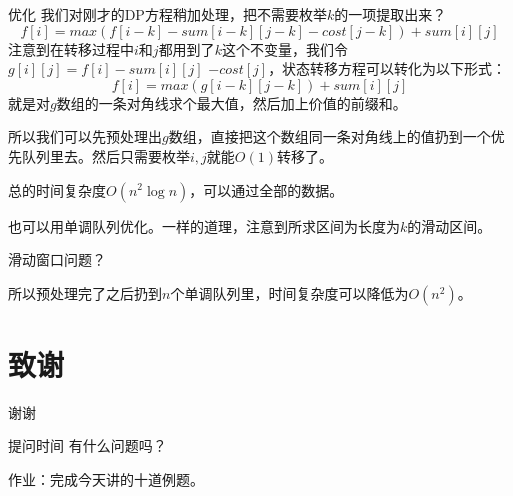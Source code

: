 \documentclass[UTF-8,aspectratio=1610]{ctexbeamer}
\begin{document}
\begin{frame}
\begin{alertblock}{优化}
\pause
我们对刚才的DP方程稍加处理，把不需要枚举$k$的一项提取出来？
\pause
\begin{equation*}
f[i]=max(f[i−k]−sum[i-k][j-k]−cost[j−k])+sum[i][j]
\end{equation*}
\pause
注意到在转移过程中$i$和$j$都用到了$k$这个不变量，我们令$g[i][j]=f[i]−sum[i][j]$ $−cost[j]$，状态转移方程可以转化为以下形式：
\pause
\begin{equation*}
f[i]=max(g[i-k][j-k])+sum[i][j]
\end{equation*}
\pause
就是对$g$数组的一条对角线求个最大值，然后加上价值的前缀和。
\pause

所以我们可以先预处理出$g$数组，直接把这个数组同一条对角线上的值扔到一个优先队列里去。然后只需要枚举$i,j$就能$O(1)$转移了。
\pause

总的时间复杂度$O(n^2\log n)$，可以通过全部的数据。
\pause

也可以用单调队列优化。一样的道理，注意到所求区间为长度为$k$的滑动区间。\pause

滑动窗口问题？\pause

所以预处理完了之后扔到$n$个单调队列里，时间复杂度可以降低为$O(n^2)$。
\end{alertblock}
\end{frame}
\section{致谢}
\begin{frame}
\begin{exampleblock}{\vspace{8pt}\begin{center}\Huge{谢谢}\vspace{8pt}\end{center}}
\vspace{8pt}
\pause
\begin{block}{提问时间}
有什么问题吗？
\end{block}
\pause
作业：完成今天讲的十道例题。
\vspace{8pt}
\end{exampleblock}
\end{frame}
\end{document}
